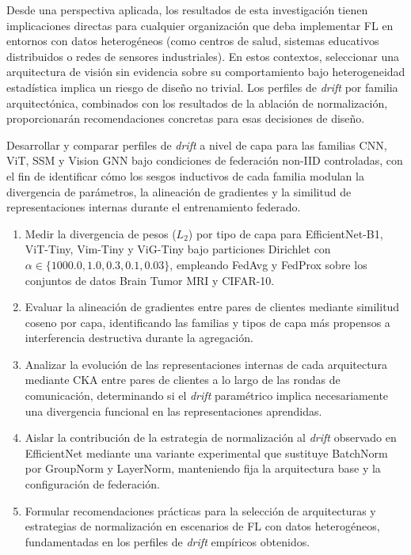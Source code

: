 Desde una perspectiva aplicada, los resultados de esta investigación tienen implicaciones 
directas para cualquier organización que deba implementar FL en entornos con datos heterogéneos 
(como centros de salud, sistemas educativos distribuidos o redes de sensores industriales). 
En estos contextos, seleccionar una arquitectura de visión sin evidencia sobre su comportamiento 
bajo heterogeneidad estadística implica un riesgo de diseño no trivial. Los perfiles de 
\textit{drift} por familia arquitectónica, combinados con los resultados de la ablación de 
normalización, proporcionarán recomendaciones concretas para esas decisiones de diseño.





Desarrollar y comparar perfiles de \textit{drift} a nivel de capa para las familias CNN, 
ViT, SSM y Vision GNN bajo condiciones de federación non-IID controladas, con el fin de 
identificar cómo los sesgos inductivos de cada familia modulan la divergencia de parámetros, 
la alineación de gradientes y la similitud de representaciones internas durante el 
entrenamiento federado.



\begin{enumerate}
    \item \sloppy Medir la divergencia de pesos ($L_2$) por tipo de capa para EfficientNet-B1, 
    ViT-Tiny, Vim-Tiny y ViG-Tiny bajo particiones Dirichlet con 
    $\alpha \in \{1000.0, 1.0, 0.3, 0.1, 0.03\}$, empleando FedAvg y FedProx sobre los 
    conjuntos de datos Brain Tumor MRI y CIFAR-10.

    \item Evaluar la alineación de gradientes entre pares de clientes mediante similitud 
    coseno por capa, identificando las familias y tipos de capa más propensos a interferencia 
    destructiva durante la agregación.

    \item Analizar la evolución de las representaciones internas de cada arquitectura mediante 
    CKA entre pares de clientes a lo largo de las rondas de comunicación, determinando si el 
    \textit{drift} paramétrico implica necesariamente una divergencia funcional en las 
    representaciones aprendidas.

    \item Aislar la contribución de la estrategia de normalización al \textit{drift} 
    observado en EfficientNet mediante una variante experimental que sustituye BatchNorm 
    por GroupNorm y LayerNorm, manteniendo fija la arquitectura base y la configuración 
    de federación.

    \item Formular recomendaciones prácticas para la selección de arquitecturas y estrategias 
    de normalización en escenarios de FL con datos heterogéneos, fundamentadas en los perfiles 
    de \textit{drift} empíricos obtenidos.
\end{enumerate}